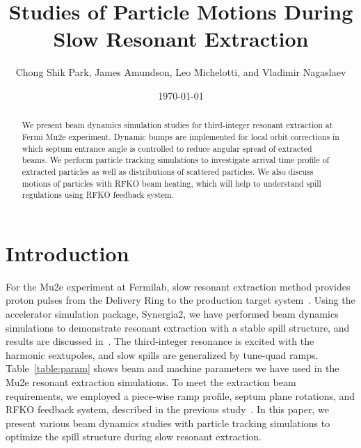 \documentclass[aps,prstab,onecolumn,preprint,endfloats,11pt]{revtex4-1}
\begin{document}
\title{Studies of Particle Motions During Slow Resonant Extraction}
\author{Chong Shik Park, James Amundson, Leo Michelotti, and Vladimir Nagaslaev}
\date{\today}

\begin{abstract}
We present beam dynamics simulation studies for third-integer resonant extraction at Fermi Mu2e experiment. Dynamic bumps are implemented for local orbit corrections in which septum entrance angle is controlled to reduce angular spread of extracted beams. We perform particle tracking simulations to investigate arrival time profile of extracted particles as well as distributions of scattered particles. We also discuss motions of particles with RFKO beam heating, which will help to understand spill regulations using RFKO feedback system.
\end{abstract}

\pacs{}
\maketitle

\setcounter{tocdepth}{7}


\section{\label{sec:intro}Introduction}

For the Mu2e experiment at Fermilab, slow resonant extraction method provides proton pulses from the Delivery Ring to the production target system~\cite{tdr}. Using the accelerator simulation package, Synergia2, we have performed beam dynamics simulations to demonstrate resonant extraction with a stable spill structure, and results are discussed in~\cite{mu2e}. The third-integer resonance is excited with the harmonic sextupoles, and slow spills are generalized by tune-quad ramps. Table~\ref{table:param} shows beam and machine parameters we have used in the Mu2e resonant extraction simulations. To meet the extraction beam requirements, we employed a piece-wise ramp profile, septum plane rotations, and RFKO feedback system, described in the previous study~\cite{mu2e}. In this paper, we present various beam dynamics studies with particle tracking simulations to optimize the spill structure during slow resonant extraction. 
\end{document}
